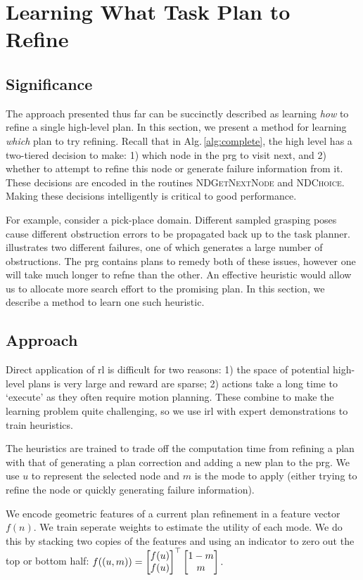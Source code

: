 \section{Learning What Task Plan to Refine}
\subsection{Significance}
The approach presented thus far can be succinctly described as
learning \emph{how} to refine a single high-level plan. In this
section, we present a method for learning \emph{which} plan to try
refining. Recall that in Alg.\,\ref{alg:complete}, the high level has
a two-tiered decision to make: 1) which node in the {\sc prg} to visit
next, and 2) whether to attempt to refine this node or generate
failure information from it. These decisions are encoded in the
routines \textsc{NDGetNextNode} and \textsc{NDChoice}. Making these
decisions intelligently is critical to good performance. 

For example, consider a pick-place domain. Different sampled grasping
poses cause different obstruction errors to be propagated back up to
the task planner.  illustrates two different
failures, one of which generates a large number of obstructions. The
{\sc prg} contains plans to remedy both of these issues, however one
will take much longer to refne than the other. An effective heuristic
would allow us to allocate more search effort to the promising
plan. In this section, we describe a method to learn one such
heuristic.

\subsection{Approach}
Direct application of {\sc rl} is difficult for two reasons: 1) the
space of potential high-level plans is very large and reward are
sparse; 2) actions take a long time to `execute' as they often require
motion planning. These combine to make the learning problem quite
challenging, so we use {\sc irl} with expert demonstrations to
train heuristics.

The heuristics are trained to trade off the computation time from
refining a plan with that of generating a plan correction and adding a
new plan to the {\sc prg}. We use $u$ to represent the selected node
and $m$ is the mode to apply (either trying to refine the node or
quickly generating failure information).

We encode geometric features of a current plan refinement in a feature
vector $f(n).$ We train seperate weights to estimate the utility of
each mode. We do this by stacking two copies of the features and using
an indicator to zero out the top or bottom half: $f((u, m))
= \begin{bmatrix} f(u) \\ f(u) \end{bmatrix}^\top \begin{bmatrix} 1 -
  m \\ m \end{bmatrix}.\vspace{2pt}$ 

